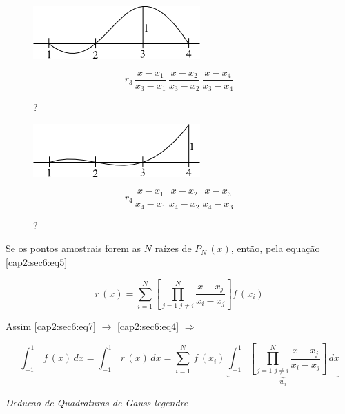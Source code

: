 \begin{enumerate}
\begin{example}
\begin{figure}[htb]
 \centering
 \begin{minipage}[c]{7cm}
    \includegraphics[scale=0.9]{capitulos/capitulo2/figuras/quadraturas_de_gauss4.png}
    \caption{?}
    \label{fig:quadraturas_de_gauss4}
 \end{minipage}\hspace*{1cm}
 \begin{minipage}[c]{6cm}
    \[
     r_3 \, \frac{x-x_1}{x_3-x_1} \, \frac{x-x_2}{x_3-x_2} \, \frac{x-x_4}{x_3-x_4}
    \]
 \end{minipage}
\end{figure}

\begin{figure}[htb]
 \centering
 \begin{minipage}[c]{7cm}
    \includegraphics[scale=0.9]{capitulos/capitulo2/figuras/quadraturas_de_gauss5.png}
    \caption{?}
    \label{fig:quadraturas_de_gauss5}
 \end{minipage}\hspace*{1cm}
 \begin{minipage}[c]{6cm}
    \[
     r_4 \, \frac{x-x_1}{x_4-x_1} \, \frac{x-x_2}{x_4-x_2} \, \frac{x-x_3}{x_4-x_3}
    \]
 \end{minipage}
\end{figure}

\end{example}

Se os pontos amostrais forem as $N$ raízes de $P_N\,(x)$, então, pela equação \ref{cap2:sec6:eq5}

\begin{equation}
 \label{cap2:sec6:eq7}
 r\,(x) =
 \sum_{i=1}^N \left[
  \prod_{
    j=1 \,\, j \neq i
  }^N
  \frac{x-x_j}{x_i-x_j}
 \right]
 f\,(x_i)
\end{equation}

Assim \ref{cap2:sec6:eq7} $\rightarrow$ \ref{cap2:sec6:eq4} $\Rightarrow$

\[
 \int_{-1}^1 \, f\,(x) \, dx = \int_{-1}^1 \, r\,(x) \, dx = \sum_{i=1}^N \, f\,(x_i) \,
 \underbrace{
 \int_{-1}^1 \left[
  \prod_{
    j=1 \,\, j \neq i
  }^N
  \frac{x-x_j}{x_i-x_j}
 \right]
 \, dx
 }_{
  w_i
 }
\]
\begin{example}
 \emph{ Deducao de Quadraturas de Gauss-legendre } 


\end{example}
\end{enumerate}
